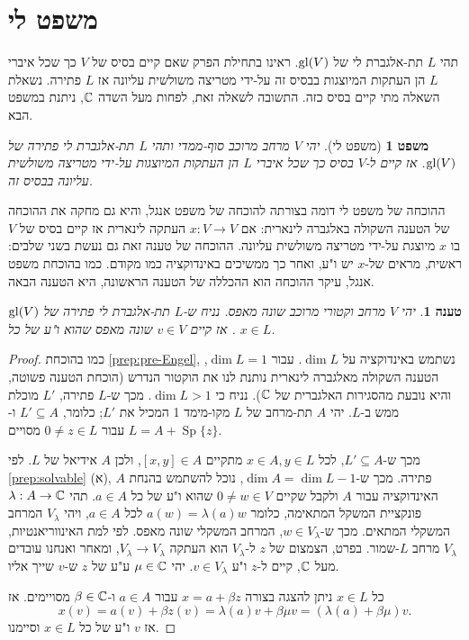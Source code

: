 \documentclass{report}
\theoremstyle{break}
\newtheorem{theorem}{משפט}[chapter]
\newtheorem{preposition}[preposition]{טענה}
\theoremstyle{MyNonumberbreak}
\newtheorem{proof}{הוכחה}
\DeclareMathOperator{\Sp}{Sp}
\begin{document}
\section{משפט לי}
תהי $L$ תת-אלגברת לי של $\operatorname{gl}(V)$. ראינו בתחילת הפרק שאם קיים בסיס של $V$ כך שכל איברי $L$ הן העתקות המיוצגות בבסיס זה על-ידי מטריצה משולשית עליונה אז $L$ פתירה. נשאלת השאלה מתי קיים בסיס כזה. התשובה לשאלה זאת, לפחות מעל השדה $\operatorname{\mathbb{C}}$, ניתנת במשפט הבא.
\begin{theorem}[משפט לי]
	יהי $V$ מרחב מרוכב סוף-ממדי ותהי $L$ תת-אלגברת לי פתירה של $\operatorname{gl}(V)$. אז קיים ל-$V$ בסיס כך שכל איברי $L$ הן העתקות המיוצגות על-ידי מטריצה משולשית עליונה בבסיס זה.
\end{theorem}
ההוכחה של משפט לי דומה בצורתה להוכחה של משפט אנגל, והיא גם מחקה את ההוכחה של הטענה השקולה באלגברה לינארית: אם $x : V \to V$ העתקה לינארית אז קיים בסיס של $V$ בו $x$ מיוצגת על-ידי מטריצה משולשית עליונה. ההוכחה של טענה זאת גם נעשת בשני שלבים: ראשית, מראים של-$x$ יש ו"ע, ואחר כך ממשיכים באינדוקציה כמו מקודם. כמו בהוכחת משפט אנגל, עיקר ההוכחה הוא ההכללה של הטענה הראשונה, היא הטענה הבאה.
\begin{preposition} \label{prep:pre-Lie}
	יהי $V$ מרחב וקטורי מרוכב שונה מאפס. נניח ש-$L$ תת-אלגברת לי פתירה של $\operatorname{gl}(V)$. אז קיים $v \in V$ שונה מאפס שהוא ו"ע של כל $x \in L$.
\end{preposition}
\begin{proof}
	כמו בהוכחת \autoref*{prep:pre-Engel}, נשתמש באינדוקציה על $\dim L$. עבור $\dim L = 1$, הטענה השקולה מאלגברה לינארית נותנת לנו את הוקטור הנדרש (הוכחת הטענה פשוטה, והיא נובעת מהסגירות האלגברית של $\operatorname{\mathbb{C}}$). נניח כי $\dim L > 1$. מכך ש-$L$ פתירה, $L'$ מוכלת ממש ב-$L$. יהי $A$ תת-מרחב של $L$ מקו-מימד 1 המכיל את $L'$; כלומר, $L' \subseteq A$ ו-$L = A + \Sp\{z\}$ עבור $0 \neq z \in L$ מסויים.
	
	מכך ש-$L' \subseteq A$, לכל $x \in A, y \in L$ מתקיים $[x, y] \in A$, ולכן $A$ אידיאל של $L$. לפי \autoref*{prep:solvable} (א), $A$ פתירה. מכך ש-$\dim A = \dim L - 1$, נוכל להשתמש בהנחת האינדוקציה עבור $A$ ולקבל שקיים $0 \neq w \in V$ שהוא ו"ע של כל $a \in A$. תהי $\lambda : A \to \operatorname{\mathbb{C}}$ פונקציית המשקל המתאימה, כלומר $a(w) = \lambda(a)w$ לכל $a \in A$, ויהי $V_\lambda$ המרחב המשקלי המתאים. מכך ש-$w \in V_\lambda$, המרחב המשקלי שונה מאפס. לפי למת האינווריאנטיות, $V_\lambda$ מרחב $L$-שמור. בפרט, הצמצום של $z$ ל-$V_\lambda$ הוא העתקה $V_\lambda \to V_\lambda$, ומאחר ואנחנו עובדים מעל $\operatorname{\mathbb{C}}$, קיים ל-$z$ ו"ע $v \in V_\lambda$. יהי $\mu \in \operatorname{\mathbb{C}}$ ע"ע של $z$ ש-$v$ שייך אליו.
	
	כל $x \in L$ ניתן להצגה בצורה $x = a + \beta z$ עבור $a \in A$ ו-$\beta \in \operatorname{\mathbb{C}}$ מסויימים. אז
	\[ x(v) = a(v) + \beta z(v) = \lambda(a)v + \beta\mu v = (\lambda(a) + \beta\mu)v. \]
	אז $v$ ו"ע של כל $x \in L$ וסיימנו.
\end{proof}
\end{document}
